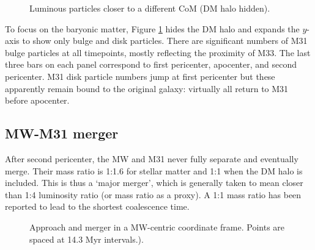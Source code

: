 \documentclass[twocolumn]{aastex63}
\begin{document}
\begin{figure}[htb!]
	\caption{Luminous particles closer to a different CoM (DM halo hidden).
		\label{fig:trans_l}}
\end{figure}

To focus on the baryonic matter, Figure \ref{fig:trans_l} hides the DM halo and expands the $y$-axis to show only bulge and disk particles. There are significant numbers of M31 bulge particles at all timepoints, mostly reflecting the proximity of M33. The last three bars on each panel correspond to first pericenter, apocenter, and second pericenter. M31 disk particle numbers jump at first pericenter but these apparently remain bound to the original galaxy: virtually all return to M31 before apocenter.


\subsection{MW-M31 merger}


After second pericenter, the MW and M31 never fully separate and eventually merge. Their mass ratio is 1:1.6 for stellar matter and 1:1 when the DM halo is included. This is thus a `major merger', which is generally taken to mean closer than 1:4 luminosity ratio (or mass ratio as a proxy). A 1:1 mass ratio has been reported \citep{boylan-kolchin_dynamical_2008, ji_lifetime_2014} to lead to the shortest coalescence time.

\begin{figure}[htb!]
	\caption{Approach and merger in a MW-centric coordinate frame. Points are spaced at 14.3 Myr intervals.).
		\label{fig:MW_M31_traj_time}}
\end{figure}
\end{document}
